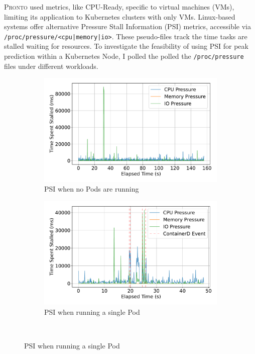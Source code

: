 \textsc{Pronto} used metrics, like CPU-Ready, specific to virtual machines
(VMs), limiting its application to Kubernetes clusters with only VMs.
Linux-based systems offer alternative Pressure Stall Information (PSI)
metrics, accessible via \texttt{/proc/pressure/<cpu|memory|io>}. These
pseudo-files track the time tasks are stalled waiting for resources. To
investigate the feasibility of using PSI for peak prediction within a Kubernetes
Node, I polled the polled the \verb|/proc/pressure| files under different
workloads.

\begin{figure}[ht!] %
    \centering %

    \begin{subfigure}[b]{0.48\textwidth} %
        \centering
        \includegraphics[width=\linewidth]{images/pressure-baseline.pdf}
        \caption{PSI when no Pods are running} %
        \label{fig:pressure-baseline} %
    \end{subfigure}%
    \hfill %
    \begin{subfigure}[b]{0.48\textwidth}
        \centering
        \includegraphics[width=\linewidth]{images/pressure-single.pdf}
        \caption{PSI when running a single Pod} %
        \label{fig:pressure-single}
    \end{subfigure}
    \\[1em] %


\end{figure}
